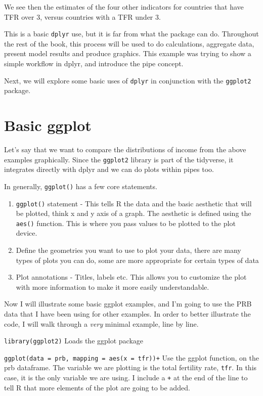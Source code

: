 \documentclass[
  letterpaper,
  DIV=11,
  numbers=noendperiod]{scrreprt}
\providecommand{\tightlist}{%
  \setlength{\itemsep}{0pt}\setlength{\parskip}{0pt}}\usepackage{longtable,booktabs,array}
\begin{document}
We see then the estimates of the four other indicators for countries
that have TFR over 3, versus countries with a TFR under 3.

This is a basic \texttt{dplyr} use, but it is far from what the package
can do. Throughout the rest of the book, this process will be used to do
calculations, aggregate data, present model results and produce
graphics. This example was trying to show a simple workflow in dplyr,
and introduce the pipe concept.

Next, we will explore some basic uses of \texttt{dplyr} in conjunction
with the \texttt{ggplot2} package.

\hypertarget{basic-ggplot}{%
\section{Basic ggplot}\label{basic-ggplot}}

Let's say that we want to compare the distributions of income from the
above examples graphically. Since the \texttt{ggplot2} library is part
of the tidyverse, it integrates directly with dplyr and we can do plots
within pipes too.

In generally, \texttt{ggplot()} has a few core statements.

\begin{enumerate}
\def\labelenumi{\arabic{enumi})}
\tightlist
\item
  \texttt{ggplot()} statement - This tells R the data and the basic
  aesthetic that will be plotted, think x and y axis of a graph. The
  aesthetic is defined using the \texttt{aes()} function. This is where
  you pass values to be plotted to the plot device.
\item
  Define the geometries you want to use to plot your data, there are
  many types of plots you can do, some are more appropriate for certain
  types of data
\item
  Plot annotations - Titles, labels etc. This allows you to customize
  the plot with more information to make it more easily understandable.
\end{enumerate}

Now I will illustrate some basic ggplot examples, and I'm going to use
the PRB data that I have been using for other examples. In order to
better illustrate the code, I will walk through a \emph{very} minimal
example, line by line.

\texttt{library(ggplot2)} Loads the ggplot package

\texttt{ggplot(data\ =\ prb,\ mapping\ =\ aes(x\ =\ tfr))+} Use the
ggplot function, on the prb dataframe. The variable we are plotting is
the total fertility rate, \texttt{tfr}. In this case, it is the only
variable we are using. I include a \texttt{+} at the end of the line to
tell R that more elements of the plot are going to be added.
\end{document}
